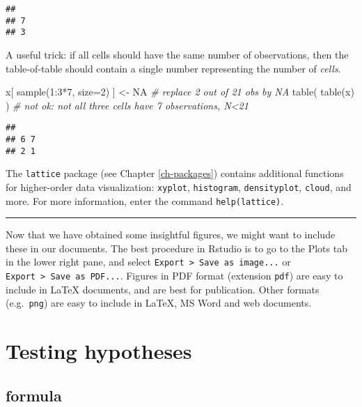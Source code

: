 \documentclass[
]{book}
\newenvironment{Shaded}{\begin{snugshade}}{\end{snugshade}}
\newcommand{\AttributeTok}[1]{\textcolor[rgb]{0.77,0.63,0.00}{#1}}
\newcommand{\CommentTok}[1]{\textcolor[rgb]{0.56,0.35,0.01}{\textit{#1}}}
\newcommand{\ConstantTok}[1]{\textcolor[rgb]{0.00,0.00,0.00}{#1}}
\newcommand{\DecValTok}[1]{\textcolor[rgb]{0.00,0.00,0.81}{#1}}
\newcommand{\FunctionTok}[1]{\textcolor[rgb]{0.00,0.00,0.00}{#1}}
\newcommand{\NormalTok}[1]{#1}
\newcommand{\OtherTok}[1]{\textcolor[rgb]{0.56,0.35,0.01}{#1}}
\newcommand{\SpecialCharTok}[1]{\textcolor[rgb]{0.00,0.00,0.00}{#1}}
\begin{document}
\begin{verbatim}
## 
## 7 
## 3
\end{verbatim}

A useful trick: if all cells should have the
same number of observations, then the table-of-table should contain
a single number representing the number of \emph{cells}.

\begin{Shaded}
\begin{Highlighting}[]
\NormalTok{x[ }\FunctionTok{sample}\NormalTok{(}\DecValTok{1}\SpecialCharTok{:}\DecValTok{3}\SpecialCharTok{*}\DecValTok{7}\NormalTok{, }\AttributeTok{size=}\DecValTok{2}\NormalTok{) ] }\OtherTok{\textless{}{-}} \ConstantTok{NA} \CommentTok{\# replace 2 out of 21 obs by NA}
\FunctionTok{table}\NormalTok{( }\FunctionTok{table}\NormalTok{(x) ) }\CommentTok{\# not ok: not all three cells have 7 observations, N\textless{}21}
\end{Highlighting}
\end{Shaded}

\begin{verbatim}
## 
## 6 7 
## 2 1
\end{verbatim}

The \texttt{lattice} package (see Chapter \ref{ch-packages}) contains additional functions for higher-order data visualization:
\texttt{xyplot},
\texttt{histogram},
\texttt{densityplot},
\texttt{cloud},
and more. For more information, enter the command
\texttt{help(lattice)}.

\begin{center}\rule{0.5\linewidth}{0.5pt}\end{center}

Now that we have obtained some insightful figures, we might want to
include these in our documents. The best procedure in Rstudio is to go to the Plots tab in the lower right pane, and select \texttt{Export\ \textgreater{}\ Save\ as\ image...} or \texttt{Export\ \textgreater{}\ Save\ as\ PDF...}. Figures in PDF format (extension
\texttt{pdf}) are easy to include in LaTeX documents, and are best for
publication. Other formats (e.g.~\texttt{png}) are easy to include
in LaTeX, MS Word and web documents.

\hypertarget{ch-testinghypotheses}{%
\chapter{Testing hypotheses}\label{ch-testinghypotheses}}

\hypertarget{formula}{%
\section{formula}\label{formula}}
\end{document}
